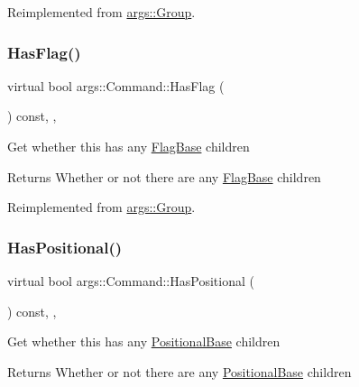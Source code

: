 Reimplemented from \hyperlink{classargs_1_1_group_a022cbdf1f4bfe4210a56fa8ca9045bf8}{args\+::\+Group}.

\mbox{\label{classargs_1_1_command_abcf9fafcb1531d3c0ea8a1b3a31c6ba4}} 
\subsubsection{\texorpdfstring{Has\+Flag()}{HasFlag()}}
{\footnotesize\ttfamily virtual bool args\+::\+Command\+::\+Has\+Flag (\begin{DoxyParamCaption}{ }\end{DoxyParamCaption}) const\hspace{0.3cm}{\ttfamily [inline]}, {\ttfamily [override]}, {\ttfamily [virtual]}}

Get whether this has any \hyperlink{classargs_1_1_flag_base}{Flag\+Base} children

\begin{DoxyReturn}{Returns}
Whether or not there are any \hyperlink{classargs_1_1_flag_base}{Flag\+Base} children 
\end{DoxyReturn}


Reimplemented from \hyperlink{classargs_1_1_group_a67e35305748038c175dee92ad1f5290f}{args\+::\+Group}.

\mbox{\label{classargs_1_1_command_a5c430c5f36d678e80420d2f094ac3a4d}} 
\subsubsection{\texorpdfstring{Has\+Positional()}{HasPositional()}}
{\footnotesize\ttfamily virtual bool args\+::\+Command\+::\+Has\+Positional (\begin{DoxyParamCaption}{ }\end{DoxyParamCaption}) const\hspace{0.3cm}{\ttfamily [inline]}, {\ttfamily [override]}, {\ttfamily [virtual]}}

Get whether this has any \hyperlink{classargs_1_1_positional_base}{Positional\+Base} children

\begin{DoxyReturn}{Returns}
Whether or not there are any \hyperlink{classargs_1_1_positional_base}{Positional\+Base} children 
\end{DoxyReturn}


